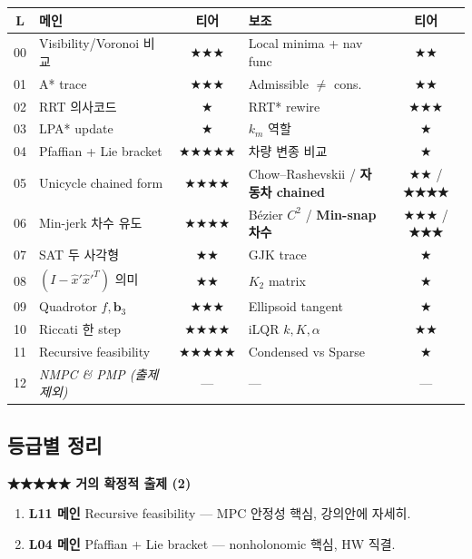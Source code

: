 \documentclass[11pt,a4paper]{article}
\begin{document}
\begin{center}
\scriptsize
\begin{tabular}{cl c l c}
\toprule
L & 메인 & 티어 & 보조 & 티어 \\
\midrule
00 & Visibility/Voronoi 비교            & ★★★    & Local minima + nav func     & ★★  \\
01 & A* trace                            & ★★★    & Admissible $\neq$ cons.     & ★★  \\
02 & RRT 의사코드                        & ★       & RRT* rewire                 & ★★★ \\
03 & LPA* update                         & ★       & $k_m$ 역할                   & ★   \\
04 & Pfaffian + Lie bracket              & ★★★★★ & 차량 변종 비교               & ★   \\
05 & Unicycle chained form               & ★★★★  & Chow--Rashevskii / \textbf{자동차 chained}        & ★★ / \textbf{★★★★} \\
06 & Min-jerk 차수 유도                   & ★★★★  & Bézier $C^2$ / \textbf{Min-snap 차수} & ★★★ / \textbf{★★★} \\
07 & SAT 두 사각형                        & ★★      & GJK trace                   & ★   \\
08 & $(I-\hat x'\hat x'^T)$ 의미          & ★★      & $K_2$ matrix                & ★   \\
09 & Quadrotor $f, \mathbf{b}_3$         & ★★★    & Ellipsoid tangent           & ★   \\
10 & Riccati 한 step                     & ★★★★  & iLQR $k, K, \alpha$         & ★★  \\
11 & Recursive feasibility               & ★★★★★ & Condensed vs Sparse         & ★   \\
12 & \textit{NMPC \& PMP (출제 제외)}      & ---     & ---                          & ---  \\
\bottomrule
\end{tabular}
\end{center}

\subsection*{등급별 정리}

\textbf{★★★★★ 거의 확정적 출제 (2)}
\begin{enumerate}
  \item \textbf{L11 메인} Recursive feasibility --- MPC 안정성 핵심, 강의안에 자세히.
  \item \textbf{L04 메인} Pfaffian + Lie bracket --- nonholonomic 핵심, HW 직결.
\end{enumerate}
\end{document}
